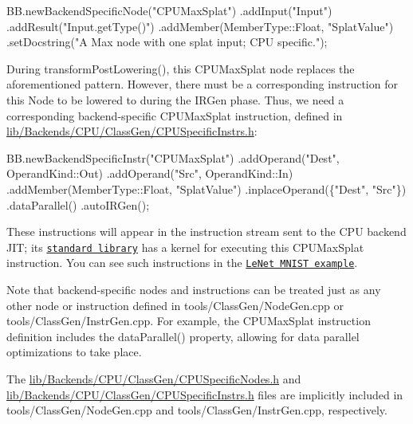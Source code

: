 \begin{DoxyCode}
BB.newBackendSpecificNode(\textcolor{stringliteral}{"CPUMaxSplat"})
    .addInput(\textcolor{stringliteral}{"Input"})
    .addResult(\textcolor{stringliteral}{"Input.getType()"})
    .addMember(MemberType::Float, \textcolor{stringliteral}{"SplatValue"})
    .setDocstring(\textcolor{stringliteral}{"A Max node with one splat input; CPU specific."});
\end{DoxyCode}


During {\ttfamily transform\+Post\+Lowering()}, this {\ttfamily C\+P\+U\+Max\+Splat} node replaces the aforementioned pattern. However, there must be a corresponding instruction for this Node to be lowered to during the I\+R\+Gen phase. Thus, we need a corresponding backend-\/specific C\+P\+U\+Max\+Splat instruction, defined in {\ttfamily \hyperlink{_c_p_u_specific_instrs_8h_source}{lib/\+Backends/\+C\+P\+U/\+Class\+Gen/\+C\+P\+U\+Specific\+Instrs.\+h}}\+:


\begin{DoxyCode}
BB.newBackendSpecificInstr("CPUMaxSplat")
    .addOperand("Dest", OperandKind::Out)
    .addOperand("Src", OperandKind::In)
    .addMember(MemberType::Float, "SplatValue")
    .inplaceOperand(\{"Dest", "Src"\})
    .dataParallel()
    .autoIRGen();
\end{DoxyCode}


These instructions will appear in the instruction stream sent to the C\+PU backend J\+IT; its \href{JIT.md#usage-of-the-standard-library}{\tt standard library} has a kernel for executing this {\ttfamily C\+P\+U\+Max\+Splat} instruction. You can see such instructions in the \href{Example.md#lowering-to-ir}{\tt Le\+Net M\+N\+I\+ST example}.

Note that backend-\/specific nodes and instructions can be treated just as any other node or instruction defined in {\ttfamily tools/\+Class\+Gen/\+Node\+Gen.\+cpp} or {\ttfamily tools/\+Class\+Gen/\+Instr\+Gen.\+cpp}. For example, the {\ttfamily C\+P\+U\+Max\+Splat} instruction definition includes the {\ttfamily data\+Parallel()} property, allowing for data parallel optimizations to take place.

The {\ttfamily \hyperlink{_c_p_u_specific_nodes_8h_source}{lib/\+Backends/\+C\+P\+U/\+Class\+Gen/\+C\+P\+U\+Specific\+Nodes.\+h}} and {\ttfamily \hyperlink{_c_p_u_specific_instrs_8h_source}{lib/\+Backends/\+C\+P\+U/\+Class\+Gen/\+C\+P\+U\+Specific\+Instrs.\+h}} files are implicitly included in {\ttfamily tools/\+Class\+Gen/\+Node\+Gen.\+cpp} and {\ttfamily tools/\+Class\+Gen/\+Instr\+Gen.\+cpp}, respectively.

